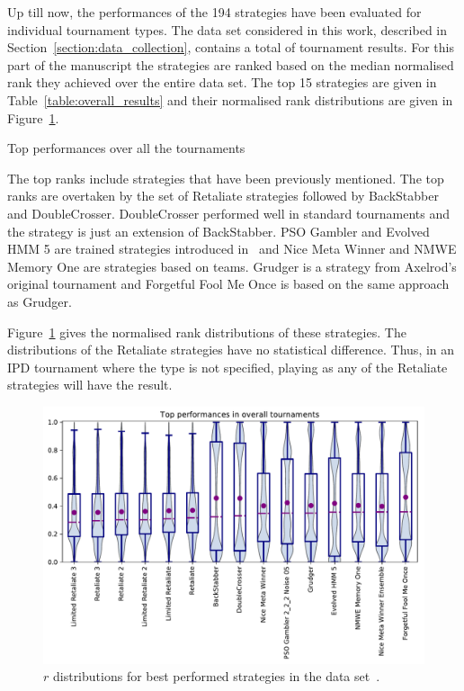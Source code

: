 \documentclass{article}
\newcommand{\numberofalltournaments}{}
\begin{document}
Up till now, the performances of the 194 strategies have been evaluated for
individual tournament types. The data set considered in this work, described in
Section~\ref{section:data_collection}, contains a total of \numberofalltournaments
tournament results. For this part of the manuscript the strategies are ranked
based on the median normalised rank they achieved over the entire data set.
The top 15 strategies are given in Table~\ref{table:overall_results}
and their normalised rank distributions are given in Figure~\ref{fig:overall_results}.

\begin{table}[!htbp]
    \centering
    \resizebox{.35\textwidth}{!}{
    }
    \caption{Top performances over all the tournaments}\label{table:overall_results}
\end{table}

The top ranks include strategies that have been previously mentioned. The top ranks
are overtaken by the set of Retaliate strategies followed by BackStabber and
DoubleCrosser. DoubleCrosser performed well in standard tournaments and the
strategy is just an extension of BackStabber. PSO Gambler and Evolved HMM 5 are
trained strategies introduced in~\cite{Harper2017} and Nice Meta Winner and NMWE
Memory One are strategies based on teams. Grudger is a strategy from Axelrod's
original tournament and Forgetful Fool Me Once is based on the same approach as
Grudger.

Figure~\ref{fig:overall_results} gives the normalised rank distributions of
these strategies. The distributions of the Retaliate strategies have no
statistical difference. Thus, in an IPD tournament where the type is not
specified, playing as any of the Retaliate strategies will have the result.

\begin{figure}[!htbp]
    \centering
    \includegraphics[width=.55\textwidth]{../images/performance_merged.pdf}
    \caption{\(r\) distributions for best performed strategies in the data set~\cite{data}.}
    \label{fig:overall_results}
\end{figure}
\end{document}
